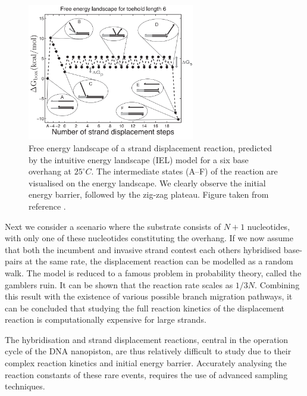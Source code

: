 \begin{figure}[ht!]
\begin{center}
  \includegraphics[width=0.65\textwidth]{Figures/ToeholdDiagram.png}
  \caption[Free energy landscape of a strand displacement reaction, predicted by the IEL
  model]{{\small Free energy landscape of a strand
displacement reaction, predicted by the intuitive energy landscape (IEL) model for a six
base overhang at $25^{\circ} C$. The intermediate states (A--F) of the reaction are
visualised on the energy landscape. We clearly observe the initial energy barrier,
followed by the zig-zag plateau. Figure taken from reference \cite{Srinivas2013}.}}
  \label{fig:IEL}
\end{center}
\end{figure}

Next we consider a scenario where the substrate consists of $N+1$ nucleotides, with only
one
of these nucleotides constituting the overhang. If we now assume that both the incumbent
and invasive strand contest each others hybridised base-pairs at the same rate, the
displacement reaction can be modelled as a random walk. The model is reduced to a famous
problem in probability theory, called the gamblers ruin. It can be shown that the
reaction rate scales as $1/3N$. Combining this result with the existence of various
possible branch migration pathways, it can be concluded that studying the full reaction
kinetics of the displacement reaction is computationally expensive for large
strands.\cite{Srinivas2013}

The hybridisation and strand displacement reactions, central in the operation cycle of
the DNA
nanopiston, are thus relatively difficult to study due to their complex reaction kinetics
and initial energy barrier. Accurately analysing the reaction constants of these rare
events, requires the use of advanced sampling techniques.
